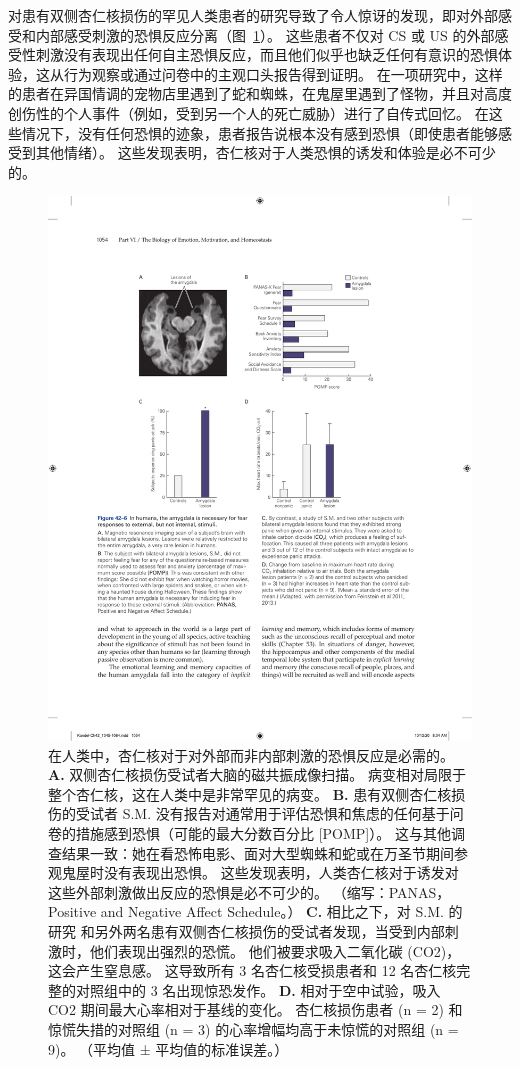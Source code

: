 对患有双侧杏仁核损伤的罕见人类患者的研究导致了令人惊讶的发现，即对外部感受和内部感受刺激的恐惧反应分离（图~\ref{fig:42_6}）。
这些患者不仅对 CS 或 US 的外部感受性刺激没有表现出任何自主恐惧反应，而且他们似乎也缺乏任何有意识的恐惧体验，这从行为观察或通过问卷中的主观口头报告得到证明。
在一项研究中，这样的患者在异国情调的宠物店里遇到了蛇和蜘蛛，在鬼屋里遇到了怪物，并且对高度创伤性的个人事件（例如，受到另一个人的死亡威胁）进行了自传式回忆。
在这些情况下，没有任何恐惧的迹象，患者报告说根本没有感到恐惧（即使患者能够感受到其他情绪）。
这些发现表明，杏仁核对于人类恐惧的诱发和体验是必不可少的。


\begin{figure}[htbp]
	\centering
	\includegraphics[width=0.7\linewidth]{chap42/fig_42_6}
	\caption{在人类中，杏仁核对于对外部而非内部刺激的恐惧反应是必需的。
		\textbf{A.} 双侧杏仁核损伤受试者大脑的磁共振成像扫描。
		病变相对局限于整个杏仁核，这在人类中是非常罕见的病变。
		\textbf{B.} 患有双侧杏仁核损伤的受试者 S.M. 没有报告对通常用于评估恐惧和焦虑的任何基于问卷的措施感到恐惧（可能的最大分数百分比 [POMP]）。
		这与其他调查结果一致：她在看恐怖电影、面对大型蜘蛛和蛇或在万圣节期间参观鬼屋时没有表现出恐惧。
		这些发现表明，人类杏仁核对于诱发对这些外部刺激做出反应的恐惧是必不可少的。 （缩写：PANAS，Positive and Negative Affect Schedule。）
		\textbf{C.} 相比之下，对 S.M. 的研究 和另外两名患有双侧杏仁核损伤的受试者发现，当受到内部刺激时，他们表现出强烈的恐慌。
		他们被要求吸入二氧化碳 (CO2)，这会产生窒息感。
		这导致所有 3 名杏仁核受损患者和 12 名杏仁核完整的对照组中的 3 名出现惊恐发作。
		\textbf{D.} 相对于空中试验，吸入 CO2 期间最大心率相对于基线的变化。
		杏仁核损伤患者 (n = 2) 和惊慌失措的对照组 (n = 3) 的心率增幅均高于未惊慌的对照组 (n = 9)。
		（平均值 ± 平均值的标准误差。）\cite{feinstein2011human} }
	\label{fig:42_6}
\end{figure}


